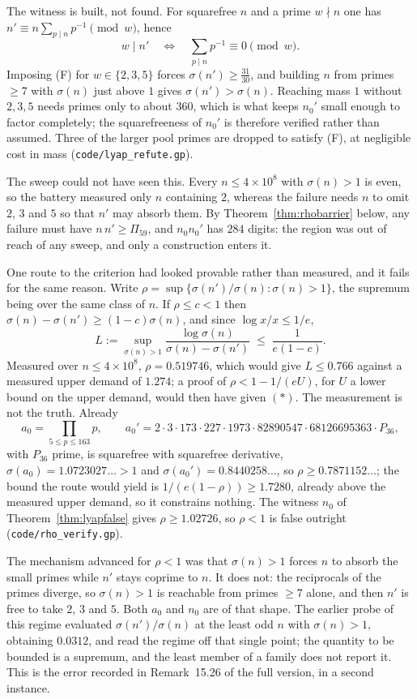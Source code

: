 \documentclass[11pt]{article}
\theoremstyle{definition}
\begin{document}
The witness is built, not found. For squarefree $n$ and a prime $w\nmid n$ one has
$n'\equiv n\sum_{p\mid n}p^{-1}\pmod w$, hence
\[ w\mid n'\quad\Longleftrightarrow\quad \sum_{p\mid n}p^{-1}\equiv0 \pmod w. \tag{F} \]
Imposing (F) for $w\in\{2,3,5\}$ forces $\sigma(n')\ge\tfrac{31}{30}$, and building $n$ from primes
$\ge7$ with $\sigma(n)$ just above $1$ gives $\sigma(n')>\sigma(n)$. Reaching mass $1$ without
$2,3,5$ needs primes only to about $360$, which is what keeps $n_0'$ small enough to factor
completely; the squarefreeness of $n_0'$ is therefore verified rather than assumed. Three of the
larger pool primes are dropped to satisfy (F), at negligible cost in mass
\textup{(\texttt{code/lyap\_refute.gp})}.

The sweep could not have seen this. Every $n\le4\times10^8$ with $\sigma(n)>1$ is even, so the
battery measured only $n$ containing $2$, whereas the failure needs $n$ to omit $2$, $3$ and $5$ so
that $n'$ may absorb them. By Theorem~\ref{thm:rhobarrier} below, any failure must have
$n\,n'\ge\Pi_{59}$, and $n_0n_0'$ has $284$ digits: the region was out of reach of any sweep, and
only a construction enters it.

One route to the criterion had looked provable rather than measured, and it fails for the same
reason. Write $\rho=\sup\{\sigma(n')/\sigma(n):\sigma(n)>1\}$, the supremum being over the same
class of $n$. If $\rho\le c<1$ then $\sigma(n)-\sigma(n')\ge(1-c)\sigma(n)$, and since
$\log x/x\le1/e$,
\[ L:=\sup_{\sigma(n)>1}\frac{\log\sigma(n)}{\sigma(n)-\sigma(n')}\;\le\;\frac1{e(1-c)} . \]
Measured over $n\le4\times10^8$, $\rho=0.519746$, which would give $L\le0.766$ against a measured
upper demand of $1.274$; a proof of $\rho<1-1/(eU)$, for $U$ a lower bound on the upper demand,
would then have given $(\ast)$. The measurement is not the truth. Already
\[ a_0=\!\!\prod_{5\le p\le163}\!\!p,\qquad
   a_0'=2\cdot3\cdot173\cdot227\cdot1973\cdot82890547\cdot68126695363\cdot P_{36}, \]
with $P_{36}$ prime, is squarefree with squarefree derivative, $\sigma(a_0)=1.0723027\ldots>1$ and
$\sigma(a_0')=0.8440258\ldots$, so $\rho\ge0.7871152\ldots$; the bound the route would yield is
$1/(e(1-\rho))\ge1.7280$, already above the measured upper demand, so it constrains nothing. The
witness $n_0$ of Theorem~\ref{thm:lyapfalse} gives $\rho\ge1.02726$, so $\rho<1$ is false outright
\textup{(\texttt{code/rho\_verify.gp})}.

The mechanism advanced for $\rho<1$ was that $\sigma(n)>1$ forces $n$ to absorb the small primes
while $n'$ stays coprime to $n$. It does not: the reciprocals of the primes diverge, so $\sigma(n)>1$
is reachable from primes $\ge7$ alone, and then $n'$ is free to take $2$, $3$ and $5$. Both $a_0$ and
$n_0$ are of that shape. The earlier probe of this regime evaluated $\sigma(n')/\sigma(n)$ at the
least odd $n$ with $\sigma(n)>1$, obtaining $0.0312$, and read the regime off that single point;
the quantity to be bounded is a supremum, and the least member of a family does not report it. This
is the error recorded in Remark~15.26 of the full version, in a second instance.
\end{document}
